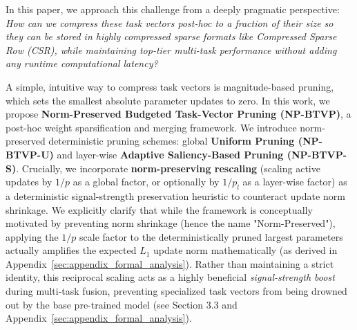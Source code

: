 In this paper, we approach this challenge from a deeply pragmatic perspective: \emph{How can we compress these task vectors post-hoc to a fraction of their size so they can be stored in highly compressed sparse formats like Compressed Sparse Row (CSR), while maintaining top-tier multi-task performance without adding any runtime computational latency?} 

A simple, intuitive way to compress task vectors is magnitude-based pruning, which sets the smallest absolute parameter updates to zero. In this work, we propose \textbf{Norm-Preserved Budgeted Task-Vector Pruning (NP-BTVP)}, a post-hoc weight sparsification and merging framework. We introduce norm-preserved deterministic pruning schemes: global \textbf{Uniform Pruning (NP-BTVP-U)} and layer-wise \textbf{Adaptive Saliency-Based Pruning (NP-BTVP-S)}. Crucially, we incorporate \textbf{norm-preserving rescaling} (scaling active updates by $1/p$ as a global factor, or optionally by $1/p_l$ as a layer-wise factor) as a deterministic signal-strength preservation heuristic to counteract update norm shrinkage. We explicitly clarify that while the framework is conceptually motivated by preventing norm shrinkage (hence the name "Norm-Preserved"), applying the $1/p$ scale factor to the deterministically pruned largest parameters actually amplifies the expected $L_1$ update norm mathematically (as derived in Appendix~\ref{sec:appendix_formal_analysis}). Rather than maintaining a strict identity, this reciprocal scaling acts as a highly beneficial \emph{signal-strength boost} during multi-task fusion, preventing specialized task vectors from being drowned out by the base pre-trained model (see Section 3.3 and Appendix~\ref{sec:appendix_formal_analysis}).

